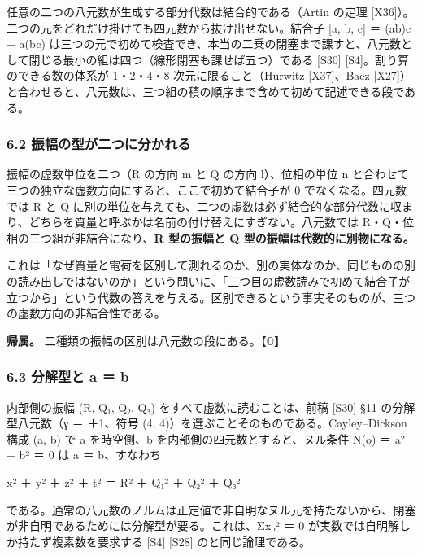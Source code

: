 \documentclass[
  a4paper,
]{ltjsarticle}
\begin{document}
任意の二つの八元数が生成する部分代数は結合的である（Artin の定理
{[}X36{]}）。二つの元をどれだけ掛けても四元数から抜け出せない。結合子
{[}a, b, c{]} ＝ (ab)c − a(bc)
は三つの元で初めて検査でき、本当の二乗の閉塞まで課すと、八元数として閉じる最小の組は四つ（線形閉塞も課せば五つ）である
{[}S30{]} {[}S4{]}。割り算のできる数の体系が 1・2・4・8
次元に限ること（Hurwitz {[}X37{]}、Baez
{[}X27{]}）と合わせると、八元数は、三つ組の積の順序まで含めて初めて記述できる段である。

\subsubsection{6.2
振幅の型が二つに分かれる}\label{ux632fux5e45ux306eux578bux304cux4e8cux3064ux306bux5206ux304bux308cux308b}

振幅の虚数単位を二つ（R の方向 m と Q の方向 l）、位相の単位 n
と合わせて三つの独立な虚数方向にすると、ここで初めて結合子が 0
でなくなる。四元数では R と Q
に別の単位を与えても、二つの虚数は必ず結合的な部分代数に収まり、どちらを質量と呼ぶかは名前の付け替えにすぎない。八元数では
R・Q・位相の三つ組が非結合になり、\textbf{R 型の振幅と Q
型の振幅は代数的に別物になる。}

これは「なぜ質量と電荷を区別して測れるのか、別の実体なのか、同じものの別の読み出しではないのか」という問いに、「三つ目の虚数読みで初めて結合子が立つから」という代数の答えを与える。区別できるという事実そのものが、三つの虚数方向の非結合性である。

\textbf{帰属。} 二種類の振幅の区別は八元数の段にある。【\(\mathbb{O}\)】

\subsubsection{6.3 分解型と \textbar a\textbar{} ＝
\textbar b\textbar{}}\label{ux5206ux89e3ux578bux3068-a-b}

内部側の振幅 (R, Q₁, Q₂, Q₃) をすべて虚数に読むことは、前稿 {[}S30{]}
§11 の分解型八元数（γ ＝ ＋1、符号 (4,
4)）を選ぶことそのものである。Cayley--Dickson 構成 (a, b) で a
を時空側、b を内部側の四元数とすると、ヌル条件 N(o) ＝
\textbar a\textbar² − \textbar b\textbar² ＝ 0 は \textbar a\textbar{}
＝ \textbar b\textbar、すなわち

x² ＋ y² ＋ z² ＋ t² ＝ R² ＋ Q₁² ＋ Q₂² ＋ Q₃²

である。通常の八元数のノルムは正定値で非自明なヌル元を持たないから、閉塞が非自明であるためには分解型が要る。これは、Σxₙ²
＝ 0 が実数では自明解しか持たず複素数を要求する {[}S4{]} {[}S28{]}
のと同じ論理である。
\end{document}
